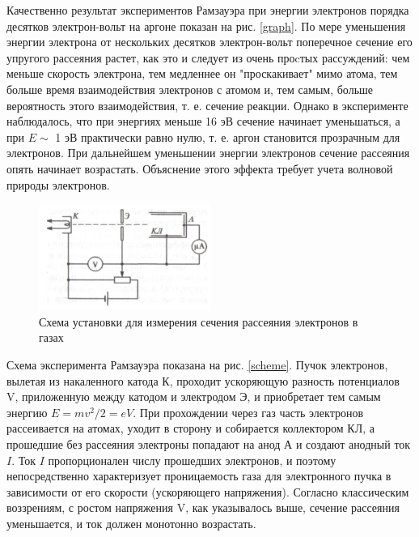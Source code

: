 \documentclass[14pt,a4paper]{scrartcl}
\begin{document}
Качественно результат экспериментов Рамзауэра при энергии электронов порядка десятков электрон-вольт на аргоне показан на рис. \ref{graph}. По мере уменьшения энергии электрона от нескольких десятков электрон-вольт поперечное сечение его упругого рассеяния растет, как это и следует из очень проcтых рассуждений: чем меньше скорость электрона, тем медленнее он "проскакивает" мимо атома, тем больше время взаимодействия электронов с атомом и, тем самым, больше вероятность этого взаимодействия, т. е. сечение реакции. Однако в эксперименте наблюдалось, что при энергиях меньше 16 эВ сечение начинает уменьшаться, а при $E \sim $ 1 эВ практически равно нулю, т. е. аргон становится прозрачным для электронов. При дальнейшем уменьшении энергии электронов сечение рассеяния опять начинает возрастать. Объяснение этого эффекта требует  учета волновой природы электронов. \\




\begin{figure}[h]
\begin{center}
\includegraphics[width = 0.5\textwidth]{scheme.png}
\caption{Схема установки для измерения сечения рассеяния электронов в газах}
\end{center}
\end{figure}





Схема эксперимента Рамзауэра показана на рис. \ref{scheme}.
Пучок электронов, вылетая из накаленного катода К, проходит ускоряющую разность потенциалов V, приложенную между катодом и электродом Э, и приобретает тем самым энергию $E = m v^2 /2 = eV$. При прохождении через газ часть электронов рассеивается на атомах, уходит в сторону и собирается коллектором КЛ, а прошедшие без рассеяния электроны попадают на анод А и создают анодный ток $I$. Ток $I$ пропорционален числу прошедших электронов, и поэтому непосредственно характеризует проницаемость газа для электронного пучка в зависимости от его скорости (ускоряющего напряжения). Согласно классическим воззрениям, с ростом напряжения V, как указывалось выше, сечение рассеяния уменьшается, и ток должен монотонно возрастать. \\
\end{document}

